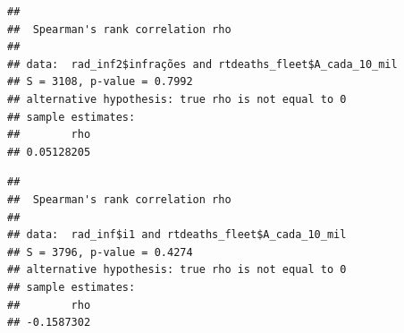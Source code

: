 \documentclass[
]{book}
\newenvironment{Shaded}{\begin{snugshade}}{\end{snugshade}}
\newcommand{\AttributeTok}[1]{\textcolor[rgb]{0.13,0.29,0.53}{#1}}
\newcommand{\FunctionTok}[1]{\textcolor[rgb]{0.13,0.29,0.53}{\textbf{#1}}}
\newcommand{\NormalTok}[1]{#1}
\newcommand{\OtherTok}[1]{\textcolor[rgb]{0.56,0.35,0.01}{#1}}
\newcommand{\SpecialCharTok}[1]{\textcolor[rgb]{0.81,0.36,0.00}{\textbf{#1}}}
\newcommand{\StringTok}[1]{\textcolor[rgb]{0.31,0.60,0.02}{#1}}
\begin{document}
\begin{Shaded}
\end{Shaded}

\begin{verbatim}
## 
##  Spearman's rank correlation rho
## 
## data:  rad_inf2$infrações and rtdeaths_fleet$A_cada_10_mil
## S = 3108, p-value = 0.7992
## alternative hypothesis: true rho is not equal to 0
## sample estimates:
##        rho 
## 0.05128205
\end{verbatim}

\begin{Shaded}
\end{Shaded}

\begin{verbatim}
## 
##  Spearman's rank correlation rho
## 
## data:  rad_inf$i1 and rtdeaths_fleet$A_cada_10_mil
## S = 3796, p-value = 0.4274
## alternative hypothesis: true rho is not equal to 0
## sample estimates:
##        rho 
## -0.1587302
\end{verbatim}
\end{document}

